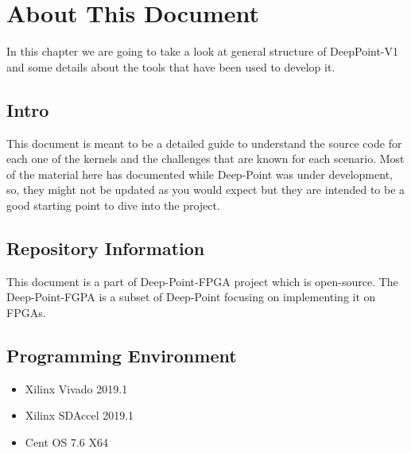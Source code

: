 \chapter{About This Document}
In this chapter we are going to take a look at general structure of DeepPoint-V1 and some details about the tools that have been used to develop it.
\section{Intro}
This document is meant to be a detailed guide to understand the source code for each one of the kernels and the challenges that are known for each scenario.
Most of the material here has documented while Deep-Point was under development, so, they might not be updated as you would expect but they are intended to be a good starting point to dive into the project.

\section{Repository Information}
This document is a part of Deep-Point-FPGA project which is open-source. The Deep-Point-FGPA is a subset of Deep-Point focusing on implementing it on FPGAs.

\section{Programming Environment}
\begin{itemize}
\item Xilinx Vivado 2019.1
\item Xilinx SDAccel 2019.1
\item Cent OS 7.6 X64
\end{itemize}